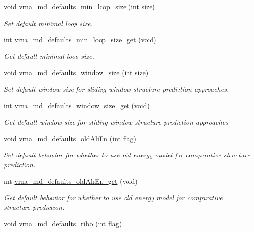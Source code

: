 \begin{DoxyCompactItemize}
void \hyperlink{group__model__details_gac152f1e78c1058a10261022c8dfda0f7}{vrna\-\_\-md\-\_\-defaults\-\_\-min\-\_\-loop\-\_\-size} (int size)
\begin{DoxyCompactList}\small\item\em Set default minimal loop size. \end{DoxyCompactList}\item 
int \hyperlink{group__model__details_ga5cc691174a75c652807dc361b617632a}{vrna\-\_\-md\-\_\-defaults\-\_\-min\-\_\-loop\-\_\-size\-\_\-get} (void)
\begin{DoxyCompactList}\small\item\em Get default minimal loop size. \end{DoxyCompactList}\item 
void \hyperlink{group__model__details_ga7b802ce0e8c3181bf5cb580de6d5b26a}{vrna\-\_\-md\-\_\-defaults\-\_\-window\-\_\-size} (int size)
\begin{DoxyCompactList}\small\item\em Set default window size for sliding window structure prediction approaches. \end{DoxyCompactList}\item 
int \hyperlink{group__model__details_ga670146a9aa3ba77f4d422d60b7c30ac9}{vrna\-\_\-md\-\_\-defaults\-\_\-window\-\_\-size\-\_\-get} (void)
\begin{DoxyCompactList}\small\item\em Get default window size for sliding window structure prediction approaches. \end{DoxyCompactList}\item 
void \hyperlink{group__model__details_ga41521d5b9fb7e0f31e7ea73f5792afab}{vrna\-\_\-md\-\_\-defaults\-\_\-old\-Ali\-En} (int flag)
\begin{DoxyCompactList}\small\item\em Set default behavior for whether to use old energy model for comparative structure prediction. \end{DoxyCompactList}\item 
int \hyperlink{group__model__details_ga2374492b5019df88022fe4c05f0f3630}{vrna\-\_\-md\-\_\-defaults\-\_\-old\-Ali\-En\-\_\-get} (void)
\begin{DoxyCompactList}\small\item\em Get default behavior for whether to use old energy model for comparative structure prediction. \end{DoxyCompactList}\item 
void \hyperlink{group__model__details_ga937c45e1d06fd6168730a9b08d130be3}{vrna\-\_\-md\-\_\-defaults\-\_\-ribo} (int flag)

\end{DoxyCompactItemize}
